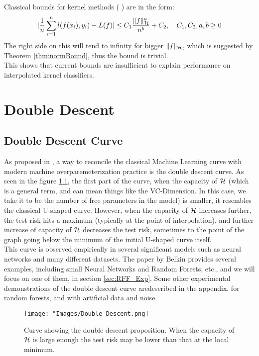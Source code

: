 \documentclass[twoside]{memoir}
\begin{document}
Classical bounds for kernel methods (\cite{UnderstandKernel,steinwartSVM, Rudi_2015} ) are in the form:
\[ \lvert\frac{1}{n} \sum_{i=1}^{n}l(f(x_i),y_i) - L(f)\rvert \leq C_1 \frac{\lVert f\rVert^a_\mathcal{H}}{n^b} + C_2, \hspace{1em} C_1, C_2,a,b \geq 0 \]
The right side on this will tend to infinity for bigger $\lVert f\rVert_\mathcal{H}$, which is suggested by Theorem \ref{thm:normBound}, thus the bound is trivial.\\
This shows that current bounds are insufficient to explain performance on interpolated kernel classifiers.

\chapter{Double Descent}

\section{Double Descent Curve}
As proposed in \cite{Belkin_2019}, a way to reconcile the classical Machine Learning curve with modern machine overparemeterization practice is the double descent curve. As seen in the figure \ref{fig:Double_Descent}, the first part of the curve, when the capacity of $\mathcal{H}$ (which is a general term, and can mean things like the VC-Dimension. In this case, we take it to be the number of free parameters in the model) is smaller, it resembles the classical U-shaped curve. However, when the capacity of $\mathcal{H}$ increases further, the test risk hits a maximum (typically at the point of interpolation), and further increase of capacity of $\mathcal{H}$ decreases the test risk, sometimes to the point of the graph going below the minimum of the initial U-shaped curve itself. \\
This curve is observed empirically in several significant models such as neural networks and many different datasets. The paper by Belkin  provides several examples, including small Neural Networks and Random Forests, etc., and we will focus on one of them, in section \ref{sec:RFF_Exp}. Some other experimental demonstrations of the double descent curve aredescribed in the appendix, for random forests, and with artificial data and noise.

\begin{figure}
	\centering
	\texttt{[image: "Images/Double\_Descent.png]}
	\par
	\caption{Curve showing the double descent proposition. When the capacity of $\mathcal{H}$ is large enough the test risk may be lower than that at the local minimum.} \label{fig:Double_Descent}
\end{figure}
\end{document}
